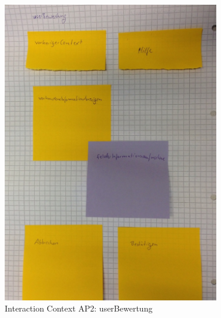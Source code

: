 \begin{figure}[H]
\centering
\includegraphics[angle=90, width=0.85\textwidth] {./images/abstract/version2/userBewertung.JPG}
\caption{Interaction Context AP2: userBewertung}
\label{interfaceContents50}
\end{figure}

